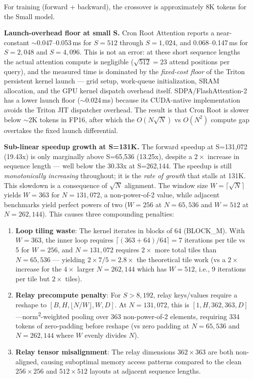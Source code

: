 \documentclass{article}
\begin{document}
    For training (forward + backward), the crossover is approximately 8K tokens for the Small model.

    \textbf{Launch-overhead floor at small S.} Cron Root Attention reports a near-constant $\sim$0.047--0.053\,ms for $S{=}512$ through $S{=}1{,}024$, and 0.068--0.147\,ms for $S{=}2{,}048$ and $S{=}4{,}096$. This is not an error: at these short sequence lengths the actual attention compute is negligible ($\sqrt{512} = 23$ attend positions per query), and the measured time is dominated by the \emph{fixed-cost floor} of the Triton persistent kernel launch --- grid setup, work-queue initialization, SRAM allocation, and the GPU kernel dispatch overhead itself. SDPA/FlashAttention-2 has a lower launch floor ($\sim$0.024\,ms) because its CUDA-native implementation avoids the Triton JIT dispatcher overhead. The result is that Cron Root is slower below $\sim$2K tokens in FP16, after which the $O(N\sqrt{N})$ vs $O(N^2)$ compute gap overtakes the fixed launch differential.

    \textbf{Sub-linear speedup growth at S=131K.} The forward speedup at S=131,072 (19.43x) is only marginally above S=65,536 (13.25x), despite a $2\times$ increase in sequence length --- well below the 30.33x at S=262,144. The speedup is still \emph{monotonically increasing} throughout; it is the \emph{rate of growth} that stalls at 131K. This slowdown is a consequence of $\sqrt{N}$ alignment. The window size $W = \lceil\sqrt{N}\rceil$ yields $W=363$ for $N=131{,}072$, a non-power-of-2 value, while adjacent benchmarks yield perfect powers of two ($W=256$ at $N=65{,}536$ and $W=512$ at $N=262{,}144$). This causes three compounding penalties:

    \begin{enumerate}
        \item \textbf{Loop tiling waste}: The kernel iterates in blocks of 64 (BLOCK\_M). With $W=363$, the inner loop requires $\lceil(363{+}64)/64\rceil = 7$ iterations per tile vs 5 for $W=256$, and $N=131{,}072$ requires $2\times$ more total tiles than $N=65{,}536$ --- yielding $2 \times 7/5 = 2.8\times$ the theoretical tile work (vs a $2\times$ increase for the $4\times$ larger $N=262{,}144$ which has $W=512$, i.e., 9 iterations per tile but $2\times$ tiles).
        \item \textbf{Relay precompute penalty}: For $S > 8{,}192$, relay keys/values require a reshape to $[B, H, \lfloor N/W \rfloor, W, D]$. At $N=131{,}072$, this is $[1, H, 362, 363, D]$---norm\textsuperscript{2}-weighted pooling over 363 non-power-of-2 elements, requiring 334 tokens of zero-padding before reshape (vs zero padding at $N=65{,}536$ and $N=262{,}144$ where $W$ evenly divides $N$).
        \item \textbf{Relay tensor misalignment}: The relay dimensions $362 \times 363$ are both non-aligned, causing suboptimal memory access patterns compared to the clean $256 \times 256$ and $512 \times 512$ layouts at adjacent sequence lengths.
    \end{enumerate}
\end{document}
